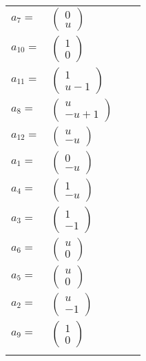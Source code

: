 \documentclass[1p]{elsarticle_modified}
\theoremstyle{definition}
\begin{document}
\begin{tabular}{m{7pt} m{180pt} m{7pt} m{180pt} }
\flushright $a_{7}=$&$\begin{pmatrix}0\\u\end{pmatrix}$ \\
\flushright $a_{10}=$&$\begin{pmatrix}1\\0\end{pmatrix}$ \\
\flushright $a_{11}=$&$\begin{pmatrix}1\\u-1\end{pmatrix}$ \\
\flushright $a_{8}=$&$\begin{pmatrix}u\\- u+1\end{pmatrix}$ \\
\flushright $a_{12}=$&$\begin{pmatrix}u\\- u\end{pmatrix}$ \\
\flushright $a_{1}=$&$\begin{pmatrix}0\\- u\end{pmatrix}$ \\
\flushright $a_{4}=$&$\begin{pmatrix}1\\- u\end{pmatrix}$ \\
\flushright $a_{3}=$&$\begin{pmatrix}1\\-1\end{pmatrix}$ \\
\flushright $a_{6}=$&$\begin{pmatrix}u\\0\end{pmatrix}$ \\
\flushright $a_{5}=$&$\begin{pmatrix}u\\0\end{pmatrix}$ \\
\flushright $a_{2}=$&$\begin{pmatrix}u\\-1\end{pmatrix}$ \\
\flushright $a_{9}=$&$\begin{pmatrix}1\\0\end{pmatrix}$\\&\end{tabular}
\end{document}
